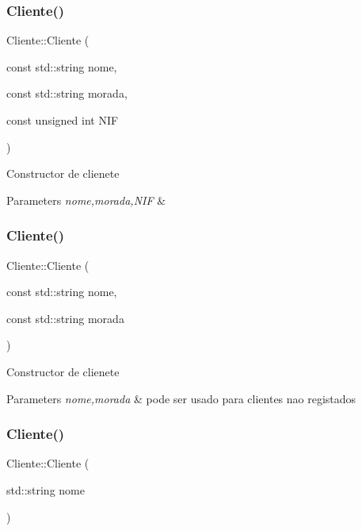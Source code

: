 \subsubsection{\texorpdfstring{Cliente()}{Cliente()}\hspace{0.1cm}{\footnotesize\ttfamily [1/3]}}
{\footnotesize\ttfamily Cliente\+::\+Cliente (\begin{DoxyParamCaption}\item[{const std\+::string}]{nome,  }\item[{const std\+::string}]{morada,  }\item[{const unsigned int}]{N\+IF }\end{DoxyParamCaption})}

Constructor de clienete 
\begin{DoxyParams}{Parameters}
{\em nome,morada,N\+IF} & \\
\hline
\end{DoxyParams}
\mbox{\label{class_cliente_a030699a841488d4b3dfbedf75834e002}} 
\subsubsection{\texorpdfstring{Cliente()}{Cliente()}\hspace{0.1cm}{\footnotesize\ttfamily [2/3]}}
{\footnotesize\ttfamily Cliente\+::\+Cliente (\begin{DoxyParamCaption}\item[{const std\+::string}]{nome,  }\item[{const std\+::string}]{morada }\end{DoxyParamCaption})}

Constructor de clienete 
\begin{DoxyParams}{Parameters}
{\em nome,morada} & pode ser usado para clientes nao registados \\
\hline
\end{DoxyParams}
\mbox{\label{class_cliente_a17e05e34ce319b738fb68c53e4ded2c3}} 
\subsubsection{\texorpdfstring{Cliente()}{Cliente()}\hspace{0.1cm}{\footnotesize\ttfamily [3/3]}}
{\footnotesize\ttfamily Cliente\+::\+Cliente (\begin{DoxyParamCaption}\item[{std\+::string}]{nome }\end{DoxyParamCaption})}


